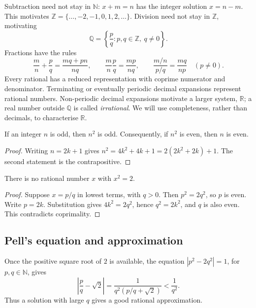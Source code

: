 Subtraction need not stay in $\mathbb N$: $x+m=n$ has the integer solution
$x=n-m$. This motivates
$\mathbb Z=\{\ldots,-2,-1,0,1,2,\ldots\}$.
Division need not stay in $\mathbb Z$, motivating
\[
\mathbb Q=\left\{\frac pq:p,q\in\mathbb Z,\ q\ne0\right\}.
\]
Fractions have the rules
\[
\frac mn+\frac pq=\frac{mq+pn}{nq},\qquad
\frac mn\frac pq=\frac{mp}{nq},\qquad
\frac{m/n}{p/q}=\frac{mq}{np}\quad(p\ne0).
\]
Every rational has a reduced representation with coprime numerator and
denominator. Terminating or eventually periodic decimal expansions represent
rational numbers. Non-periodic decimal expansions motivate a larger system,
$\mathbb R$; a real number outside $\mathbb Q$ is called \emph{irrational}.
We will use completeness, rather than decimals, to characterise $\mathbb R$.

\begin{lemma}[Parity]
If an integer $n$ is odd, then $n^2$ is odd. Consequently, if $n^2$ is even,
then $n$ is even.
\end{lemma}
\begin{proof}
Writing $n=2k+1$ gives
$n^2=4k^2+4k+1=2(2k^2+2k)+1$. The second statement is the contrapositive.
\end{proof}

\begin{theorem}
There is no rational number $x$ with $x^2=2$.
\end{theorem}
\begin{proof}
Suppose $x=p/q$ in lowest terms, with $q>0$. Then $p^2=2q^2$, so $p$ is even.
Write $p=2k$. Substitution gives $4k^2=2q^2$, hence $q^2=2k^2$, and $q$ is
also even. This contradicts coprimality.
\end{proof}

\subsection{Pell's equation and approximation}
Once the positive square root of $2$ is available, the equation
$|p^2-2q^2|=1$, for $p,q\in\mathbb N$, gives
\[
\left|\frac pq-\sqrt2\right|
=\frac{1}{q^2(p/q+\sqrt2)}<\frac1{q^2}.
\]
Thus a solution with large $q$ gives a good rational approximation.

